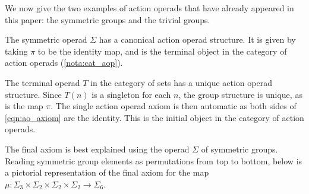 We now give the two examples of action operads that have already appeared in this paper: the symmetric groups and the trivial groups.

\begin{example}\label{example:aop-sym}
The symmetric operad $\Sigma$ has a canonical action operad structure. It is given by taking $\pi$ to be the identity map, and is the terminal object in the category of action operads (\cref{nota:cat_aop}).
\end{example}

\begin{example}\label{example:aop-triv}
The terminal operad $T$ in the category of sets has a unique action operad structure. Since $T(n)$ is a singleton for each $n$, the group structure is unique, as is the map $\pi$. The single action operad axiom is then automatic as both sides of \cref{eqn:ao_axiom} are the identity. This is the initial object in the category of action operads.
\end{example}

\begin{rem}
The final axiom is best explained using the operad $\Sigma$ of symmetric groups. Reading symmetric group elements as permutations from top to bottom, below is a pictorial representation of the final axiom for the map $\mu \colon \Sigma_{3} \times \Sigma_{2} \times \Sigma_{2} \times \Sigma_{2} \rightarrow \Sigma_{6}.$
  \begin{center}
  \end{center}
\end{rem}

